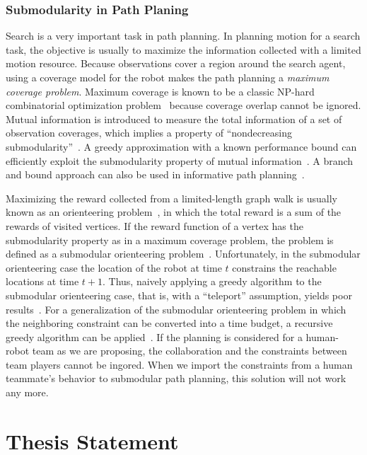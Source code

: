 \documentclass[phd]{byuprop}
\begin{document}
\subsubsection{Submodularity in Path Planing}
\label{sec:related_work:algorithm_specific_work:submodularity_in_path_planning}

Search is a very important task in path planning.
In planning motion for a search task, the objective is usually to maximize the information collected with a limited motion resource.
Because observations cover a region around the search agent, using a coverage model for the robot makes the path planning a {\em maximum coverage problem}.
Maximum coverage is known to be a classic NP-hard combinatorial optimization problem~\cite{Megiddo1983} because coverage overlap cannot be ignored. 
Mutual information is introduced to measure the total information
of a set of observation coverages, which implies a property of ``nondecreasing submodularity''~\cite{Singh2009}. 
A greedy approximation with a known performance bound can efficiently exploit the submodularity property of mutual information~\cite{Singh2009}. 
A branch and bound approach can also be used in informative path
planning~\cite{Binney2012}.

Maximizing the reward collected from a limited-length graph walk is usually known as an orienteering problem~\cite{Vansteenwegen2011}, in which the total reward is a sum of the rewards of visited vertices. 
If the reward function of a vertex has the submodularity property as in a maximum coverage problem, the problem is defined as a submodular orienteering problem~\cite{Chekuri2005}. 
Unfortunately, in the submodular orienteering case the location of the robot at time $ t $ constrains the reachable locations at time $ t+1 $.
Thus, naively applying a greedy algorithm to the submodular orienteering case, that is, with a 		``teleport'' assumption, yields poor results~\cite{Krause2012}. 
For a generalization of the submodular orienteering problem in which the neighboring constraint can be converted into a time budget, a recursive greedy algorithm can be applied~\cite{Chekuri2005}.
If the planning is considered for a human-robot team as we are proposing, the collaboration and the constraints between team players cannot be ingored.
When we import the constraints from a human teammate's behavior to submodular path planning, this solution will not work any more. 


\section{Thesis Statement}
\label{sec:thesis_statement}
\end{document}
